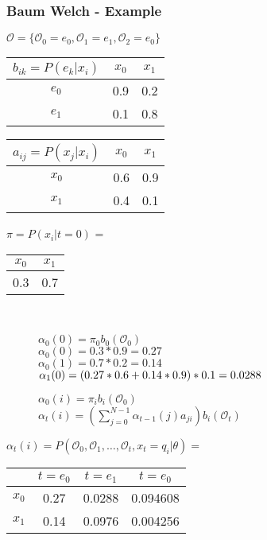 \begin{frame}
	\frametitle{Baum Welch - Example}
  \begin{table}
  \centering
  $\mathcal{O} = \{\mathcal{O}_0 = e_0, \mathcal{O}_1 = e_1, \mathcal{O}_2 = e_0\}$\\
  \begin{tabular}{| c | c | c |}
  	\hline
    $b_{ik} = P(e_k|x_i)$ & $x_0$ & $x_1$ \\ \hline
    $e_0$                 & 0.9   & 0.2   \\ \hline
    $e_1$                 & 0.1   & 0.8   \\ \hline
  \end{tabular}
  \begin{tabular}{| c | c | c |}
  	\hline
    $a_{ij} = P(x_j|x_i)$ & $x_0$ & $x_1$ \\ \hline
    $x_0$                 & 0.6   & 0.9   \\ \hline
    $x_1$                 & 0.4   & 0.1   \\ \hline
  \end{tabular}
  $\pi = P(x_i|t=0)$ =
  \begin{tabular}{| c | c |}
  	\hline
    $x_0$ & $x_1$ \\ \hline
    0.3   & 0.7   \\ \hline
  \end{tabular}\\
  \begin{subfigure}{4.3cm}
  \begin{framed}
  $\alpha_0(0)=\pi_0 b_0(\mathcal{O}_0)$\\
  $\alpha_0(0)=0.3*0.9=0.27$\\
  $\alpha_0(1)=0.7*0.2=0.14$\\
  $\alpha_1(0)=\\(0.27*0.6+0.14*0.9)*0.1=0.0288$
  \end{framed}
  \end{subfigure}
  \begin{subfigure}{5.4cm}
  \centering
  \begin{framed}
  $\alpha_0(i) = \pi_i b_i(\mathcal{O}_0)$\\
  $\alpha_t(i) = \left(\sum\limits_{j=0}^{N-1} \alpha_{t-1}(j)a_{ji}\right)b_i(\mathcal{O}_t)$
  \end{framed}  
  \end{subfigure}
  $\alpha_t(i) = P(\mathcal{O}_0, \mathcal{O}_1, \dots ,\mathcal{O}_t , x_t = q_i | \theta) =$
  \begin{tabular}{| c | c | c | c |}
  	\hline
          & $t=e_0$ & $t=e_1$ & $t=e_0$ \\ \hline
    $x_0$ & 0.27    & 0.0288  & 0.094608 \\ \hline
    $x_1$ & 0.14    & 0.0976  & 0.004256 \\ \hline
  \end{tabular}
\end{table}
\end{frame}


